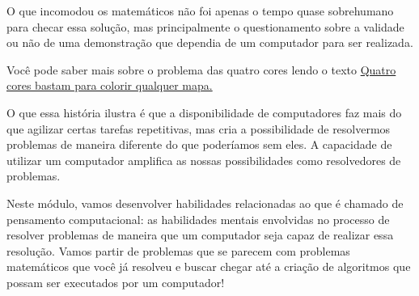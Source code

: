 O que incomodou os matemáticos não foi apenas o tempo quase sobrehumano para checar essa solução, mas principalmente o questionamento sobre a validade ou não de uma demonstração que dependia de um computador para ser realizada.

\begin{knowledge}
Você pode saber mais sobre o problema das quatro cores lendo o texto \href{https://impa.br/noticias/quatro-cores-bastam-para-colorir-qualquer-mapa/}{Quatro cores bastam para colorir qualquer mapa.}
\end{knowledge}

O que essa história ilustra é que a disponibilidade de computadores faz mais do que agilizar certas tarefas repetitivas, mas cria a possibilidade de resolvermos problemas de maneira diferente do que poderíamos sem eles. A capacidade de utilizar um computador amplifica as nossas possibilidades como resolvedores de problemas.

Neste módulo, vamos desenvolver habilidades relacionadas ao que é chamado de pensamento computacional: as habilidades mentais envolvidas no processo de resolver problemas de maneira que um computador seja capaz de realizar essa resolução. Vamos partir de problemas que se parecem com problemas matemáticos que você já resolveu e buscar chegar até a criação de algoritmos que possam ser executados por um computador!

